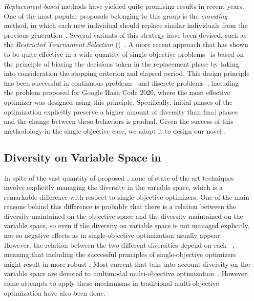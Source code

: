 \textit{Replacement-based} methods have yielded quite promising results in recent years.
%
One of the most popular proposals belonging to this group is the \textit{crowding} method, 
in which each new individual should replace similar individuals from the previous generation~\cite{mengshoel2014adaptive}.
%
Several variants of this strategy have been devised, such as the \textit{Restricted Tournament Selection} 
(\RTS{})~\cite{harik1995finding}.
%
A more recent approach that has shown to be quite effective in a wide quantity of single-objective problems~\cite{segura2016improving}
is based on the principle of biasing the decisions taken in the replacement phase by taking into consideration the 
stopping criterion and elapsed period.
%
This design principle has been successful in continuous problems~\cite{castillo2019differential} and discrete 
problems~\cite{segura2016improving,romero2018memetic}, including the problem proposed for Google Hash Code 2020, where the most
effective optimizer was designed using this principle.
%
Specifically, initial phases of the optimization explicitly preserve a higher amount of diversity than final phases and the
change between these behaviors is gradual.
%
Given the success of this methodology in the single-objective case, we adopt it to design our novel \MOEA{}.


\subsection{Diversity on Variable Space in \MOEAS{}}\label{MOEAs:Diversity}

In spite of the vast quantity of proposed \MOEAS{}, none of state-of-the-art techniques involve
explicitly managing the diversity in the variable space, which is a remarkable difference with respect
to single-objective optimizers.
%
One of the main reasons behind this difference is probably that there is a relation between the diversity maintained on the objective 
space and the diversity maintained on the variable space, so even if the diversity on variable space is not managed explicitly,
not so negative effects as in single-objective optimization usually appear.
%
%
However, the relation between the two different diversities depend on each \MOP{}~\cite{shir2009enhancing}, meaning
that including the successful principles of single-objective optimizers might result in more robust \MOEAS{}.
%
Most current \MOEAS{} that take into account diversity on the variable space are devoted to multimodal 
multi-objective optimization~\cite{deb2008omni, cuate2019variation}.
%
However, some attempts to apply these mechanisms in traditional multi-objective optimization have also been done.

